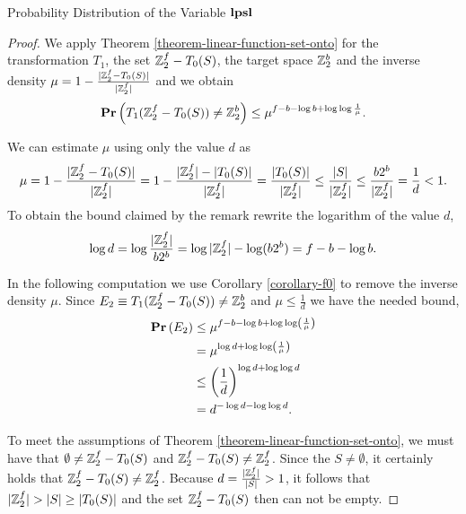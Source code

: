 \begin{section}{Probability Distribution of the Variable \texorpdfstring{$\mathbf{lpsl}$}{lpsl}}
\begin{proof}
We apply Theorem \ref{theorem-linear-function-set-onto} for the transformation $T_1$, the set $\mathbb{Z}_{2}^{f} - T_0(S)$, the target space $\mathbb{Z}_{2}^{b}$ and the inverse density $\mu = 1 - \frac{|\mathbb{Z}_{2}^{f} - T_0(S)|}{|\mathbb{Z}_{2}^{f}|}$ and we obtain
\[
	\mathbf{Pr}\left(T_1(\mathbb{Z}_{2}^{f} - T_0(S)) \neq \mathbb{Z}_{2}^{b}\right) \leq \mu ^ {f - b - \log b + \log \log \frac{1}{\mu}} \text{.}
\]

We can estimate $\mu$ using only the value $d$ as
\[
	\mu = 1 - \frac{|\mathbb{Z}_{2}^{f} - T_0(S)|}{|\mathbb{Z}_{2}^{f}|} = 1 - \frac{|\mathbb{Z}_{2}^{f}| - |T_0(S)|}{|\mathbb{Z}_{2}^{f}|} = \frac{|T_0(S)|}{|\mathbb{Z}_{2}^{f}|} \leq \frac{|S|}{|\mathbb{Z}_{2}^{f}|} \leq \frac{b2^b}{|\mathbb{Z}_{2}^{f}|} = \frac{1}{d} < 1 \text{.}
\]
To obtain the bound claimed by the remark rewrite the logarithm of the value $d$,
\[
	\log d = \log \frac{|\mathbb{Z}_{2}^{f}|}{b2^b} = \log |\mathbb{Z}_{2}^{f}| - \log (b 2 ^ b) = f - b - \log b \text{.}
\]

In the following computation we use Corollary \ref{corollary-f0} to remove the inverse density $\mu$. Since $E_2 \equiv T_1(\mathbb{Z}_{2}^{f} - T_0(S)) \neq \mathbb{Z}_{2}^{b}$ and $\mu \leq \frac{1}{d}$ we have the needed bound,
\[
\begin{split}
\mathbf{Pr}\left(E_2\right)
	& \leq \mu^{f - b - \log b + \log \log \left(\frac{1}{\mu}\right)} \\
	& = \mu ^ {\log d + \log \log \left(\frac{1}{\mu}\right)} \\
	& \leq \left(\frac{1}{d}\right) ^ {\log d + \log \log d} \\
	& = d ^ {-\log d - \log \log d} \text{.} \\
\end{split}
\]

To meet the assumptions of Theorem \ref{theorem-linear-function-set-onto}, we must have that $\emptyset \neq \mathbb{Z}_{2}^{f} - T_0(S)$ and $\mathbb{Z}_{2}^{f} - T_0(S) \neq \mathbb{Z}_{2}^{f}$. Since the $S \neq \emptyset$, it certainly holds that $\mathbb{Z}_{2}^{f} - T_0(S) \neq \mathbb{Z}_{2}^{f}$. Because $d = \frac{|\mathbb{Z}_{2}^{f}|}{|S|} > 1$, it follows that $|\mathbb{Z}_{2}^{f}| > |S| \geq |T_0(S)|$ and the set $\mathbb{Z}_{2}^{f} - T_0(S)$ then can not be empty.


\end{proof}
\end{section}
